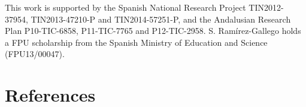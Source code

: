 \documentclass[preprint,12pt]{elsarticle}
\begin{document}
This work is supported by the Spanish National Research Project TIN2012-37954, TIN2013-47210-P and TIN2014-57251-P, and the Andalusian Research Plan P10-TIC-6858, P11-TIC-7765 and P12-TIC-2958. S. Ram\'irez-Gallego holds a FPU scholarship from the Spanish Ministry of Education and Science (FPU13/00047).

\section*{References}



 



%
%
%
\end{document}
